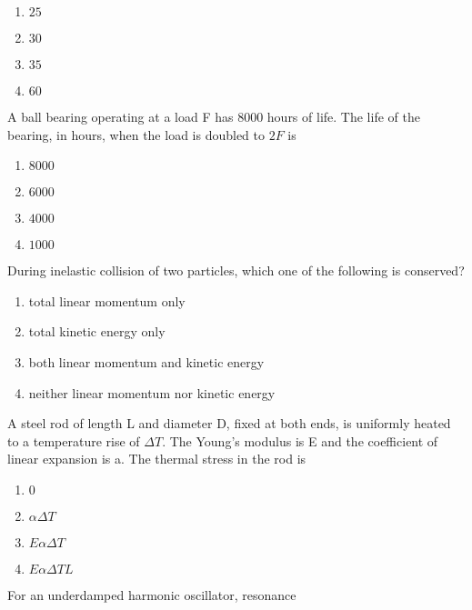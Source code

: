 \begin{multicols}{4}
    \begin{enumerate}
        \item $25$
        \item $30$
        \item $35$
        \item $60$
    \end{enumerate}
\end{multicols}
\bigskip
\item A ball bearing operating at a load F has 8000 hours of life. The life of the bearing, in hours, when the load is doubled to $2F$ is
\begin{multicols}{4}
    \begin{enumerate}
        \item $8000$
        \item $6000$
        \item $4000$
        \item $1000$
    \end{enumerate}
\end{multicols}
\bigskip
\item During inelastic collision of two particles, which one of the following is conserved?
\begin{enumerate}
        \item total linear momentum only
        \item total kinetic energy only
        \item both linear momentum and kinetic energy
        \item neither linear momentum nor kinetic energy 
\end{enumerate}
\bigskip
\item A steel rod of length L and diameter D, fixed at both ends, is uniformly heated to a temperature rise of $\Delta T$. The Young's modulus is E and the coefficient of linear expansion is a. The thermal stress in the rod is
\begin{multicols}{4}
    \begin{enumerate}
        \item $0$
        \item $\alpha\Delta T$
        \item $E\alpha\Delta T$
        \item $E\alpha\Delta TL$
    \end{enumerate}
\end{multicols}
\bigskip
\item For an underdamped harmonic oscillator, resonance

